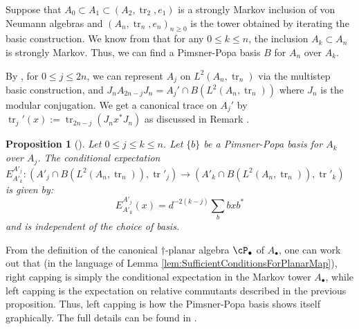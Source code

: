 \documentclass[11pt]{article}
\theoremstyle{plain}
\newtheorem{prop}[thm]{Proposition}
\theoremstyle{definition}
\DeclareMathOperator{\tr}{tr}
\begin{document}
Suppose that $A_0\subset A_1 \subset \left(A_2,\tr_2,e_1\right)$ is a strongly Markov inclusion of von Neumann algebras and $\left(A_n,\tr_n,e_n\right)_{n\geq 0}$ is the tower obtained by iterating the basic construction. 
We know from \cite[Cor.~2.18]{MR2812459} that for any $0\leq k \leq n$, the inclusion $A_k \subset A_n$ is strongly Markov. 
Thus, we can find a Pimsner-Popa basis $B$ for $A_n$ over $A_k$.

By \cite[Prop.~2.20]{MR2812459}, for $0\leq j\leq 2n$, we can represent $A_j$ on $L^2(A_n, \tr_n)$ via the multistep basic construction, and $J_n A_{2n-j} J_n = A_j'\cap B(L^2(A_n, \tr_n))$ where $J_n$ is the modular conjugation.
We get a canonical trace on $A_j'$ by $\tr_j'(x):=\tr_{2n-j}(J_n x^*J_n)$ as discussed in Remark \cite[Rem.~2.21]{MR2812459}.


\begin{prop}[{\cite[Prop.~2.24]{MR2812459}}]
\label{prop:LeftCapping}
Let $0\leq j \leq k \leq n $. 
Let $\{b\}$ be a Pimsner-Popa basis for $A_k$ over $A_j$.
The conditional expectation $E_{A'_k}^{A'_j}: (A'_j\cap B(L^2(A_n,\tr_n)),\tr'_j)\rightarrow (A'_k \cap B(L^2(A_n,\tr_n)),\tr'_k)$ is given by:
\[
E^{A'_j}_{A'_k}(x)
=
d^{-2(k-j)} \sum_{b } bxb^{\ast}
\]
and is independent of the choice of basis.
\end{prop}
From the definition of the canonical $\dag$-planar algebra $\cP_\bullet$ of $A_\bullet$, one can work out that (in the language of Lemma \ref{lem:SufficientConditionsForPlanarMap}), right capping is simply the conditional expectation in the Markov tower $A_\bullet$, while left capping is the expectation on relative commutants described in the previous proposition. 
Thus, left capping is how the Pimsner-Popa basis shows itself graphically. 
The full details can be found in \cite[Prop.~2.47]{MR2812459}. 
\end{document}

